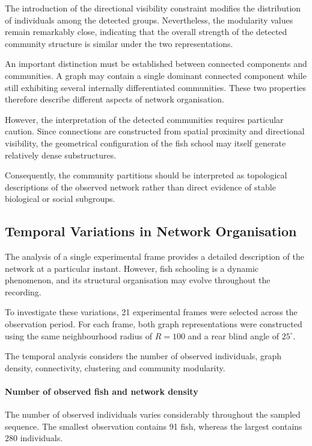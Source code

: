 \documentclass[10pt,a4paper]{article}
\begin{document}
The introduction of the directional visibility
constraint modifies the distribution of
individuals among the detected groups.
Nevertheless, the modularity values remain
remarkably close, indicating that the overall
strength of the detected community structure
is similar under the two representations.

An important distinction must be established
between connected components and communities.
A graph may contain a single dominant connected
component while still exhibiting several
internally differentiated communities.
These two properties therefore describe
different aspects of network organisation.

However, the interpretation of the detected
communities requires particular caution.
Since connections are constructed from spatial
proximity and directional visibility, the
geometrical configuration of the fish school
may itself generate relatively dense
substructures.

Consequently, the community partitions
should be interpreted as topological
descriptions of the observed network
rather than direct evidence of stable
biological or social subgroups.

\FloatBarrier


\subsection{Temporal Variations in Network Organisation}
\label{subsec:temporal_variations}

The analysis of a single experimental frame provides
a detailed description of the network at a particular
instant. However, fish schooling is a dynamic
phenomenon, and its structural organisation may
evolve throughout the recording.

To investigate these variations, 21 experimental
frames were selected across the observation period.
For each frame, both graph representations were
constructed using the same neighbourhood radius
of $R=100$ and a rear blind angle of $25^\circ$.

The temporal analysis considers the number of
observed individuals, graph density, connectivity,
clustering and community modularity.

\paragraph{Number of observed fish and network density}

The number of observed individuals varies
considerably throughout the sampled sequence.
The smallest observation contains 91 fish,
whereas the largest contains 280 individuals.
\end{document}
